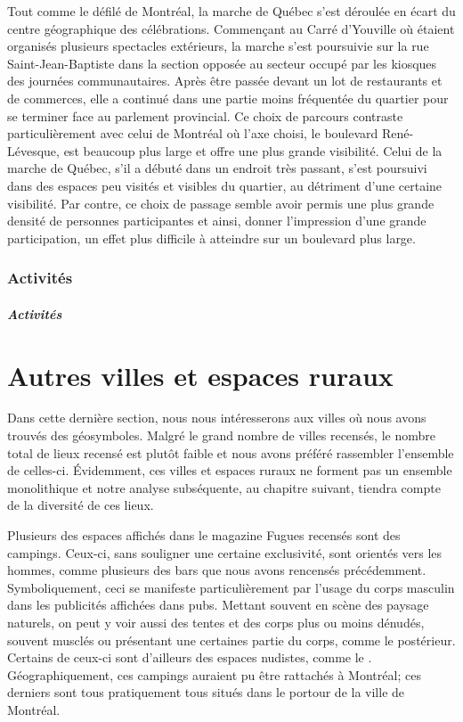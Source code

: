 Tout comme le défilé de Montréal, la marche de Québec s'est déroulée en écart du centre géographique des célébrations.
Commençant au Carré d'Youville où étaient organisés plusieurs spectacles extérieurs, la marche s'est poursuivie sur la rue Saint-Jean-Baptiste dans la section opposée au secteur occupé par les kiosques des journées communautaires.
Après être passée devant un lot de restaurants et de commerces, elle a continué dans une partie moins fréquentée du quartier pour se terminer face au parlement provincial.
Ce choix de parcours contraste particulièrement avec celui de Montréal où l'axe choisi, le boulevard René-Lévesque, est beaucoup plus large et offre une plus grande visibilité.
Celui de la marche de Québec, s'il a débuté dans un endroit très passant, s'est poursuivi dans des espaces peu visités et visibles du quartier, au détriment d'une certaine visibilité.
Par contre, ce choix de passage semble avoir permis une plus grande densité de personnes participantes et ainsi, donner l'impression d'une grande participation, un effet plus difficile à atteindre sur un boulevard plus large.


\subsubsection{Activités}
\subparagraph{Activités}
\label{subsec:activitesfiertemontreal}

\section{Autres villes et espaces ruraux}
\label{subsec:autresvilles}

Dans cette dernière section, nous nous intéresserons aux villes où nous avons trouvés des géosymboles.
Malgré le grand nombre de villes recensés, le nombre total de lieux \lgbt{} recensé est plutôt faible et nous avons préféré rassembler l'ensemble de celles-ci.
Évidemment, ces villes et espaces ruraux ne forment pas un ensemble monolithique et notre analyse subséquente, au chapitre suivant, tiendra compte de la diversité de ces lieux.

Plusieurs des espaces affichés dans le magazine Fugues recensés sont des campings.
Ceux-ci, sans souligner une certaine exclusivité, sont orientés vers les hommes, comme plusieurs des bars que nous avons rencensés précédemment.
Symboliquement, ceci se manifeste particulièrement par l'usage du corps masculin dans les publicités affichées dans pubs.
Mettant souvent en scène des paysage naturels, on peut y voir aussi des tentes et des corps plus ou moins dénudés, souvent musclés ou présentant une certaines partie du corps, comme le postérieur.
Certains de ceux-ci sont d'ailleurs des espaces nudistes, comme le .
Géographiquement, ces campings auraient pu être rattachés à Montréal; ces derniers sont tous pratiquement tous situés dans le portour de la ville de Montréal.

